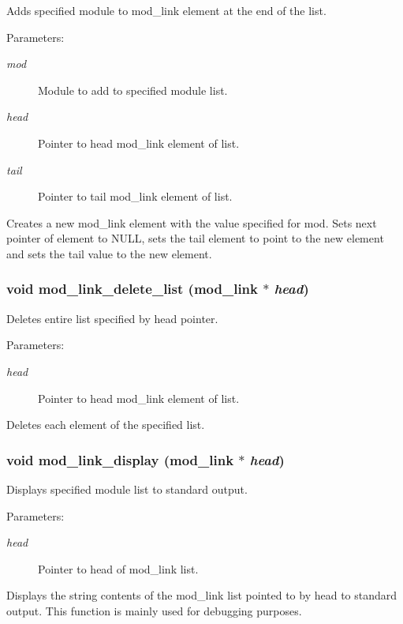 Adds specified module to mod\_\-link element at the end of the list.

\begin{Desc}
\item[Parameters: ]\par
\begin{description}
\item[{\em 
mod}]Module to add to specified module list. \item[{\em 
head}]Pointer to head mod\_\-link element of list. \item[{\em 
tail}]Pointer to tail mod\_\-link element of list.\end{description}
\end{Desc}
Creates a new mod\_\-link element with the value specified for mod. Sets next pointer of element to NULL, sets the tail element to point to the new element and sets the tail value to the new element. 
\subsubsection{\setlength{\rightskip}{0pt plus 5cm}void mod\_\-link\_\-delete\_\-list ({\bf mod\_\-link} $\ast$ {\em head})}\label{link_8c_a15}


Deletes entire list specified by head pointer.

\begin{Desc}
\item[Parameters: ]\par
\begin{description}
\item[{\em 
head}]Pointer to head mod\_\-link element of list.\end{description}
\end{Desc}
Deletes each element of the specified list. 
\subsubsection{\setlength{\rightskip}{0pt plus 5cm}void mod\_\-link\_\-display ({\bf mod\_\-link} $\ast$ {\em head})}\label{link_8c_a7}


Displays specified module list to standard output.

\begin{Desc}
\item[Parameters: ]\par
\begin{description}
\item[{\em 
head}]Pointer to head of mod\_\-link list.\end{description}
\end{Desc}
Displays the string contents of the mod\_\-link list pointed to by head to standard output. This function is mainly used for debugging purposes. 
